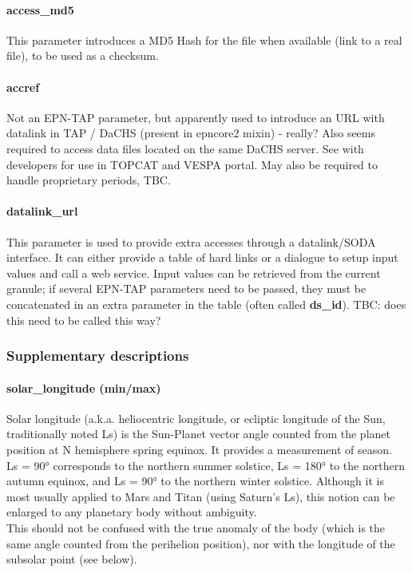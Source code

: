 \documentclass[11pt,a4paper]{ivoa}
\begin{document}
\paragraph{access\_md5}

This parameter introduces a MD5 Hash for the file when available (link to a real file), to be used as a checksum.\\

\paragraph{accref}

Not an EPN-TAP parameter, but apparently used to introduce an URL with datalink in TAP / DaCHS (present in epncore2 mixin) - really? Also seems required to access data files located on the same DaCHS server. See with developers for use in TOPCAT and VESPA portal. May also be required to handle proprietary periods, TBC. \\

\paragraph{datalink\_url}

This parameter is used to provide extra accesses through a datalink/SODA interface. It can either provide a table of hard links or a dialogue to setup input values and call a web service. Input values can be retrieved from the current granule; if several EPN-TAP parameters need to be passed, they must be concatenated in an extra parameter in the table (often called \textbf{ds\_id}). TBC: does this need to be called this way?

\subsubsection{Supplementary descriptions\\}

\paragraph{solar\_longitude (min/max)}

Solar longitude (a.k.a. heliocentric longitude, or ecliptic longitude of the Sun, traditionally noted Ls) is the Sun-Planet vector angle counted from the planet position at N hemisphere spring equinox. It provides a measurement of season. \\ Ls = 90° corresponds to the northern summer solstice, Ls = 180° to the northern autumn equinox, and Ls = 90° to the northern winter solstice. Although it is most usually applied to Mars and Titan (using Saturn's Ls), this notion can be enlarged to any planetary body without ambiguity.\\ This should not be confused with the true anomaly of the body (which is the same angle counted from the perihelion position), nor with the longitude of the subsolar point (see below).
\end{document}
